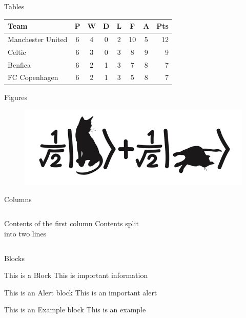 \documentclass[xcolor={dvipsnames},10pt]{beamer}
\begin{document}
\begin{frame}{Tables}

    \begin{table}
        \begin{tabular}{l*{6}{c}r}
            \toprule
            Team              & P & W & D & L & F  & A & Pts \\
            \midrule
            Manchester United & 6 & 4 & 0 & 2 & 10 & 5 & 12  \\
            Celtic            & 6 & 3 & 0 & 3 &  8 & 9 &  9  \\
            Benfica           & 6 & 2 & 1 & 3 &  7 & 8 &  7  \\
            FC Copenhagen     & 6 & 2 & 1 & 3 &  5 & 8 &  7  \\
            \bottomrule
        \end{tabular}
    \end{table}

\end{frame}

\begin{frame}{Figures}
    \begin{figure}[ht!]
        \centering
        \includegraphics[width=\textwidth]{cat.jpg}
    \end{figure}
\end{frame}

\begin{frame}{Columns}
    \begin{columns}[c] %
        Contents of the first column
        Contents split \\ into two lines
    \end{columns}
\end{frame}

\begin{frame}{Blocks}

    \begin{block}{This is a Block}
        This is important information
    \end{block}

    \begin{alertblock}{This is an Alert block}
        This is an important alert
    \end{alertblock}

    \begin{exampleblock}{This is an Example block}
        This is an example
    \end{exampleblock}

\end{frame}
\end{document}
